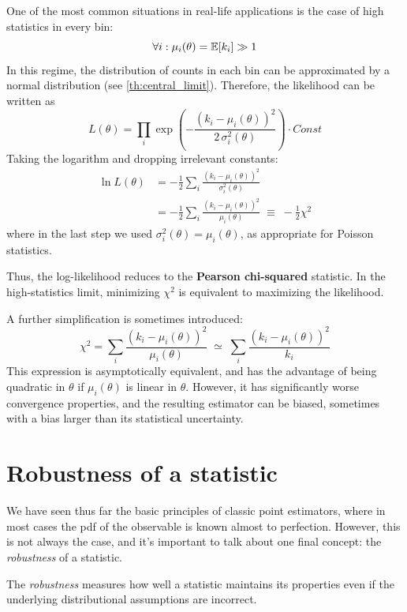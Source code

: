 One of the most common situations in real-life applications is the case of high statistics in every bin:
\[
	\forall i: \mu_i(\theta)=\mathbb{E}[k_i] \gg 1
\]
In this regime, the distribution of counts in each bin can be approximated by a normal distribution (see \ref{th:central_limit}). Therefore, the likelihood can be written as
\[
L(\theta) = \prod_i \exp\left(-\frac{(k_i - \mu_i(\theta))^2}{2\,\sigma_i^2(\theta)}\right) \cdot Const
\]
Taking the logarithm and dropping irrelevant constants:
\begin{align*}
	\ln L(\theta)
	&= -\frac{1}{2}\sum_i \frac{(k_i - \mu_i(\theta))^2}{\sigma_i^2(\theta)} \\
	&= -\frac{1}{2}\sum_i \frac{(k_i - \mu_i(\theta))^2}{\mu_i(\theta)}
	\;\equiv\; -\frac{1}{2}\chi^2
\end{align*}
where in the last step we used $\sigma_i^2(\theta) = \mu_i(\theta)$, as appropriate for Poisson statistics.

Thus, the log-likelihood reduces to the \textbf{Pearson chi-squared} statistic. In the high-statistics limit, minimizing $\chi^2$ is equivalent to maximizing the likelihood.

A further simplification is sometimes introduced:
\begin{equation*}
	\chi^2 = \sum_i \frac{(k_i - \mu_i(\theta))^2}{\mu_i(\theta)}
	\;\simeq\;
	\sum_i \frac{(k_i - \mu_i(\theta))^2}{k_i}
	\tag{Modified $\chi^2$}
	\label{eq:modified_chi2}
\end{equation*}
This expression is asymptotically equivalent, and has the advantage of being quadratic in $\theta$ if $\mu_i(\theta)$ is linear in $\theta$. However, it has significantly worse convergence properties, and the resulting estimator can be biased, sometimes with a bias larger than its statistical uncertainty.

\section{Robustness of a statistic}
We have seen thus far the basic principles of classic point estimators, where in most cases the pdf of the observable is known almost to perfection. However, this is not always the case, and it's important to talk about one final concept: the \emph{robustness} of a statistic. 

\begin{definition}
	The \emph{robustness} measures how well a statistic maintains its properties even if the underlying distributional assumptions are incorrect. 
\end{definition}

